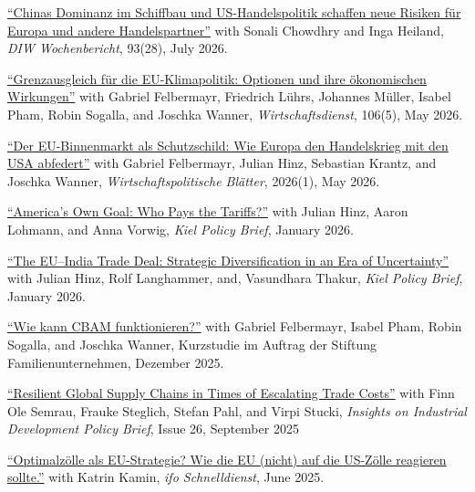 \documentclass{article}
\newlength{\cvlabelwidth}\setlength{\cvlabelwidth}{0.12\textwidth}
\newlength{\cvlabelgap}\setlength{\cvlabelgap}{5mm}
\newcommand{\cvmakelabel}[1]{%
    \smash{\parbox[t]{\cvlabelwidth}{\raggedright{\fontfamily{phv}\selectfont #1}}}}
\newenvironment{cvsection}[1]{%
    \par\medskip
    \begin{list}{}{%
        \setlength{\leftmargin}{\dimexpr\cvlabelwidth+\cvlabelgap\relax}%
        \setlength{\labelwidth}{\cvlabelwidth}%
        \setlength{\labelsep}{\cvlabelgap}%
        \setlength{\rightmargin}{0pt}%
        \setlength{\itemindent}{0pt}%
        \setlength{\listparindent}{0pt}%
        \setlength{\topsep}{0pt}%
        \setlength{\partopsep}{0pt}%
        \setlength{\parsep}{0.3em}%
        \setlength{\itemsep}{0pt}%
        \let\makelabel\cvmakelabel%
    }%
    \item[#1]\ignorespaces%
}{%
    \end{list}\medskip%
}
\begin{document}
\begin{cvsection}{COMMENTARY \& POLICY REPORTS}
  \href{https://doi.org/10.18723/diw_wb:2026-28-1}{``Chinas Dominanz im Schiffbau und US-Handelspolitik schaffen neue Risiken für Europa und andere Handelspartner''} with Sonali Chowdhry and Inga Heiland, \textit{DIW Wochenbericht}, 93(28), July 2026. \par
  \href{https://doi.org/10.2478/wd-2026-00}{``Grenzausgleich für die EU-Klimapolitik: Optionen und ihre ökonomischen Wirkungen''} with Gabriel Felbermayr, Friedrich Lührs, Johannes Müller, Isabel Pham, Robin Sogalla, and Joschka Wanner, \textit{Wirtschaftsdienst}, 106(5), May 2026. \par
  \href{https://doi.org/10.2478/wpbl-2026-0003}{``Der EU-Binnenmarkt als Schutzschild: Wie Europa den Handelskrieg mit den USA abfedert''} with Gabriel Felbermayr, Julian Hinz, Sebastian Krantz, and Joschka Wanner, \textit{Wirtschaftspolitische Blätter}, 2026(1), May 2026. \par
  \href{https://www.kielinstitut.de/publications/americas-own-goal-who-pays-the-tariffs-19398/}{``America’s Own Goal: Who Pays the Tariffs?''} with Julian Hinz, Aaron Lohmann, and Anna Vorwig, \textit{Kiel Policy Brief}, January 2026. \par
  \href{https://www.kielinstitut.de/publications/the-eu-india-trade-deal-strategic-diversification-in-an-era-of-uncertainty-19443/}{``The EU–India Trade Deal: Strategic Diversification in an Era of Uncertainty''} with Julian Hinz, Rolf Langhammer,
and, Vasundhara Thakur, \textit{Kiel Policy Brief}, January 2026. \par
  \href{https://www.familienunternehmen.de/de/publikationen/wie-kann-cbam-funktionieren}{``Wie kann CBAM funktionieren?''} with Gabriel Felbermayr, Isabel Pham, Robin Sogalla, and Joschka Wanner, Kurzstudie im Auftrag der Stiftung Familienunternehmen, Dezember 2025. \par
  \href{https://www.unido.org/sites/default/files/unido-publications/2025-10/IID%20Policy%20Brief%2026%20-%20Resilient%20global%20supply%20chains%20in%20times%20of%20escalating%20trade%20costs.pdf}{``Resilient Global Supply Chains in Times of Escalating Trade Costs''} with Finn Ole Semrau, Frauke Steglich, Stefan Pahl, and Virpi Stucki, \textit{Insights on Industrial Development Policy Brief}, Issue 26, September 2025 \par
  \href{https://www.ifo.de/DocDL/sd-2025-06-zdg-kamin-mahlkow-welthandel-am-abgrund.pdf}{``Optimalzölle als EU-Strategie? Wie die EU (nicht) auf die US-Zölle reagieren sollte.''} with Katrin Kamin, \textit{ifo Schnelldienst}, June 2025.\par

\end{cvsection}
\end{document}

